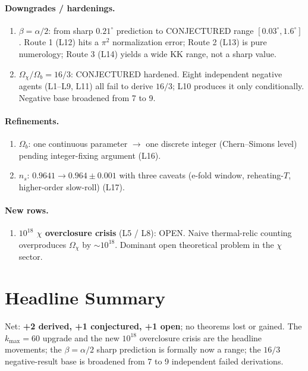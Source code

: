 \documentclass[11pt]{article}
\begin{document}
\paragraph{Downgrades / hardenings.}
\begin{enumerate}\itemsep1pt
  \item $\beta = \alpha/2$: from sharp $0.21^\circ$ prediction to CONJECTURED range $[0.03^\circ, 1.6^\circ]$. Route 1 (L12) hits a $\pi^2$ normalization error; Route 2 (L13) is pure numerology; Route 3 (L14) yields a wide KK range, not a sharp value.
  \item $\Omega_\chi/\Omega_b = 16/3$: CONJECTURED hardened. Eight independent negative agents (L1--L9, L11) all fail to derive $16/3$; L10 produces it only conditionally. Negative base broadened from 7 to 9.
\end{enumerate}

\paragraph{Refinements.}
\begin{enumerate}\itemsep1pt
  \item $\Omega_b$: one continuous parameter $\to$ one discrete integer (Chern--Simons level) pending integer-fixing argument (L16).
  \item $n_s$: $0.9641 \to 0.964 \pm 0.001$ with three caveats (e-fold window, reheating-$T$, higher-order slow-roll) (L17).
\end{enumerate}

\paragraph{New rows.}
\begin{enumerate}\itemsep1pt
  \item \textbf{$10^{18}$ $\chi$ overclosure crisis} (L5 / L8): OPEN. Naive thermal-relic counting overproduces $\Omega_\chi$ by $\sim 10^{18}$. Dominant open theoretical problem in the $\chi$ sector.
\end{enumerate}

\section*{Headline Summary}

\noindent Net: \textbf{+2 derived, +1 conjectured, +1 open}; no theorems lost or gained.
The $k_{\max}=60$ upgrade and the new $10^{18}$ overclosure crisis are the headline movements;
the $\beta=\alpha/2$ sharp prediction is formally now a range; the $16/3$ negative-result base is
broadened from 7 to 9 independent failed derivations.
\end{document}
